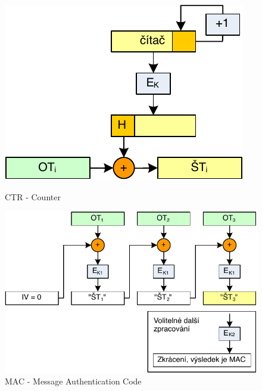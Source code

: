 \documentclass{szzclass}
\begin{document}
\begin{figure}[ht!]
\centering
\begin{minipage}{.5\textwidth}
  \centering
  \includegraphics[width=.5\linewidth]{topics/bi-spol-07/images/ctr}
  \caption{CTR - Counter}
\end{minipage}%
\begin{minipage}{.5\textwidth}
  \centering
  \includegraphics[width=.75\linewidth]{topics/bi-spol-07/images/mac}
  \caption{MAC - Message Authentication Code}
\end{minipage}
\end{figure}


\end{document}
